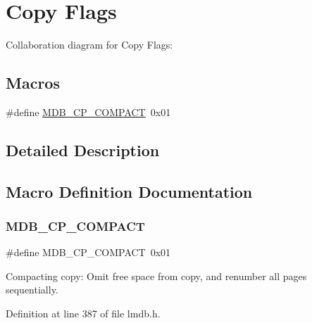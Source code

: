 \hypertarget{group__mdb__copy}{}\section{Copy Flags}
\label{group__mdb__copy}
Collaboration diagram for Copy Flags\+:
\subsection*{Macros}
\begin{DoxyCompactItemize}
\item 
\#define \mbox{\hyperlink{group__mdb__copy_gad38b21b591921c711e025703620f396e}{M\+D\+B\+\_\+\+C\+P\+\_\+\+C\+O\+M\+P\+A\+CT}}~0x01
\end{DoxyCompactItemize}


\subsection{Detailed Description}


\subsection{Macro Definition Documentation}
\mbox{\label{group__mdb__copy_gad38b21b591921c711e025703620f396e}} 
\subsubsection{\texorpdfstring{M\+D\+B\+\_\+\+C\+P\+\_\+\+C\+O\+M\+P\+A\+CT}{MDB\_CP\_COMPACT}}
{\footnotesize\ttfamily \#define M\+D\+B\+\_\+\+C\+P\+\_\+\+C\+O\+M\+P\+A\+CT~0x01}

Compacting copy\+: Omit free space from copy, and renumber all pages sequentially. 

Definition at line 387 of file lmdb.\+h.

